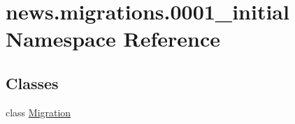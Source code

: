 \hypertarget{namespacenews_1_1migrations_1_10001__initial}{}\section{news.\+migrations.0001\+\_\+initial Namespace Reference}
\label{namespacenews_1_1migrations_1_10001__initial}
\subsection*{Classes}
\begin{DoxyCompactItemize}
\item 
class \mbox{\hyperlink{classnews_1_1migrations_1_10001__initial_1_1_migration}{Migration}}
\end{DoxyCompactItemize}
